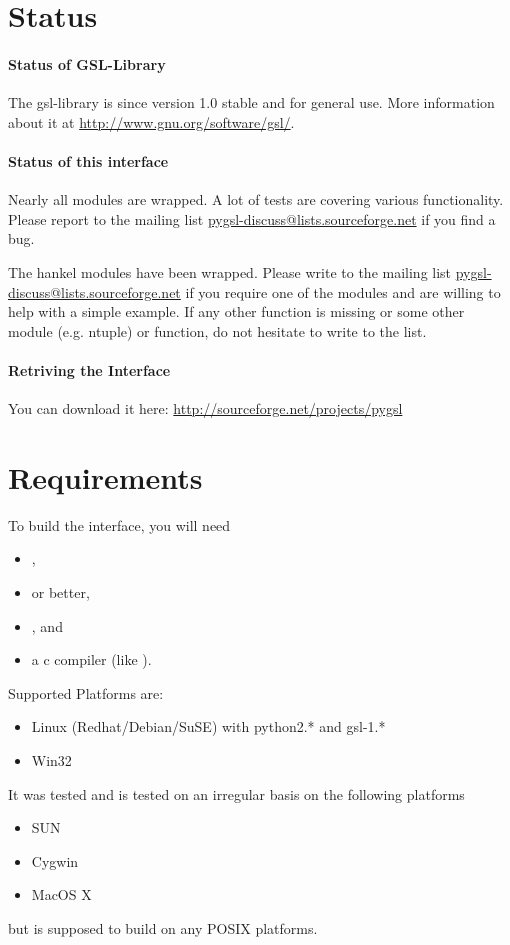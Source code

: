 \section{Status}

\paragraph*{Status of GSL-Library}
The gsl-library is since version 1.0 stable and for general use.
More information about it at \url{http://www.gnu.org/software/gsl/}.

\paragraph*{Status of this interface}
Nearly all modules are wrapped. A lot of tests are
covering various functionality. Please report to the mailing list
\url{pygsl-discuss@lists.sourceforge.net} if you find a bug.

The hankel modules have been
wrapped. Please write to the mailing list
\url{pygsl-discuss@lists.sourceforge.net} 
if you require one of the modules
and are willing to help with a simple example. 
If any other function is missing or some other module (e.g. ntuple) or
function, do not hesitate to write to the list.

\paragraph*{Retriving the Interface}
You can download it here: \url{http://sourceforge.net/projects/pygsl}

\section{Requirements}

To build the interface, you will need
\begin{itemize}
\item {},
\item {} or better,
\item {}, and
\item a c compiler (like ).
\end{itemize}

Supported Platforms are:
\begin{itemize}
\item Linux (Redhat/Debian/SuSE) with python2.* and gsl-1.*
\item Win32
\end{itemize}
It was tested and is tested on an irregular basis on the following platforms
\begin{itemize}
\item SUN
\item Cygwin
\item MacOS X
\end{itemize}
but is supposed to build on any POSIX platforms.

